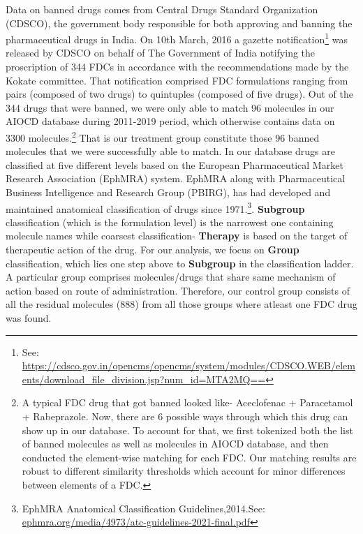 \documentclass[AER]{AEA}
\theoremstyle{theorem}
\begin{document}
Data on banned drugs comes from Central Drugs Standard Organization (CDSCO), the government body responsible for both approving and banning the pharmaceutical drugs in India. On 10th March, 2016 a gazette notification\footnote{See: \url{https://cdsco.gov.in/opencms/opencms/system/modules/CDSCO.WEB/elements/download\_file\_division.jsp?num\_id=MTA2MQ==}} was released by CDSCO on behalf of The Government of India notifying the proscription of 344 FDCs in accordance with the recommendations made by the Kokate committee. That notification comprised FDC formulations  ranging from pairs (composed of two drugs) to quintuples (composed of five drugs). Out of the 344 drugs that were banned, we were only able to match 96 molecules in our AIOCD database during 2011-2019 period, which otherwise contains data on 3300 molecules.\footnote{A typical FDC drug that got banned looked like- Aceclofenac + Paracetamol + Rabeprazole. Now, there are 6 possible ways through which this drug can show up in our database. To account for that, we first tokenized both the list of banned molecules as well as molecules in AIOCD database, and then conducted the element-wise matching for each FDC. Our matching results are robust to different similarity thresholds which account for minor differences between elements of a FDC.}
That is our treatment group constitute those 96 banned molecules that we were successfully able to match. In our database drugs are classified at five different levels based on the European Pharmaceutical Market Research Association (EphMRA) system. EphMRA along with Pharmaceutical Business Intelligence and Research Group (PBIRG), has had developed and maintained anatomical classification of drugs since 1971.\footnote{EphMRA Anatomical Classification Guidelines,2014.See: \url{ephmra.org/media/4973/atc-guidelines-2021-final.pdf} }. \textbf{Subgroup} classification (which is the formulation level) is the narrowest one containing molecule names while coarsest classification- \textbf{Therapy} is based on the target of therapeutic action of the drug. For our analysis, we focus on \textbf{Group} classification, which lies one step above to \textbf{Subgroup} in the classification ladder. A particular group comprises molecules/drugs that share same mechanism of action based on route of administration. Therefore, our control group consists of all the residual molecules (888) from all those groups where atleast one FDC drug was found. 
\end{document}
